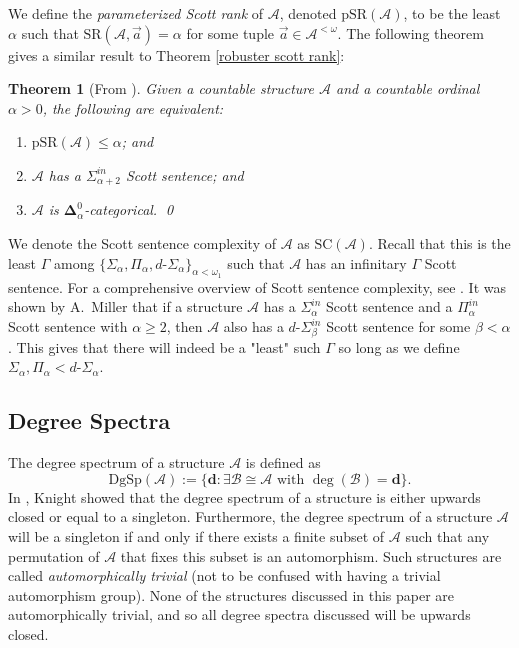 \documentclass{amsart}%
\newtheorem{theorem}{Theorem}
\numberwithin{theorem}{section}
\newcommand{\A}{\mathcal{A}}
\newcommand{\B}{\mathcal{B}}
\newcommand{\0}{\emptyset}
\newcommand{\ddd}{\boldsymbol{d}}
\newcommand{\lom}{^{< \omega}}
\newcommand{\E}{\exists}
\newcommand{\dgsp}{\text{DgSp}}
\newcommand{\SR}{\text{SR}}
\newcommand{\pSR}{\text{pSR}}
\newcommand{\SC}{\text{SC}}
\begin{document}
We define the \emph{parameterized Scott rank} of $\A$, denoted $\pSR(\A)$, to be the least $\alpha$ such that $\SR(\A,\vec a)=\alpha$ for some tuple $\vec a\in \A\lom$. The following theorem gives a similar result to Theorem \ref{robuster scott rank}:

\begin{theorem}[From \cite{Scott-rank}]
\label{robust pSR}
Given a countable structure $\A$ and a countable ordinal $\alpha>0$, the following are equivalent:

\begin{enumerate}
    \item $\pSR(\A)\leq \alpha$; and
    \item $\A$ has a $\Sigma^{in}_{\alpha+2}$ Scott sentence; and
    \item $\A$ is $\boldsymbol{\Delta}^0_\alpha$-categorical.  \qed
\end{enumerate}
\end{theorem}

We denote the Scott sentence complexity of $\A$ as $\SC(\A)$. Recall that this is the least $\Gamma$ among $\{\Sigma_\alpha,\Pi_\alpha,d\text{-}\Sigma_\alpha\}_{\alpha<\omega_1}$ such that $\A$ has an infinitary $\Gamma$ Scott sentence. For a comprehensive overview of Scott sentence complexity, see \cite{HARRISON-TRAINOR_2022}. It was shown by A.\ Miller \cite{A-Miller} that if a structure $\A$ has a $\Sigma^{in}_\alpha$ Scott sentence and a $\Pi^{in}_\alpha$ Scott sentence with $\alpha\geq2$, then $\A$ also has a $d$-$\Sigma_\beta^{in}$ Scott sentence for some $\beta<\alpha$. This gives that there will indeed be a "least" such $\Gamma$ so long as we define $\Sigma_\alpha,\Pi_\alpha < d$-$\Sigma_\alpha$.

\subsection{Degree Spectra}
The degree spectrum of a structure $\A$ is defined as $$\dgsp(\A):= \{\ddd: \E\B\cong \A \text{ with } \deg(\B)=\ddd\}.$$ In \cite{Knight_1986}, Knight showed that the degree spectrum of a structure is either upwards closed or equal to a singleton. Furthermore, the degree spectrum of a structure $\A$ will be a singleton if and only if  there exists a finite subset  of $\A$ such that
any permutation of $\A$ that fixes this subset is an automorphism. Such structures are called \emph{automorphically trivial} (not to be confused with having a trivial automorphism group). None of the structures discussed in this paper are automorphically trivial, and so all degree spectra discussed will be upwards closed. 
\end{document}
